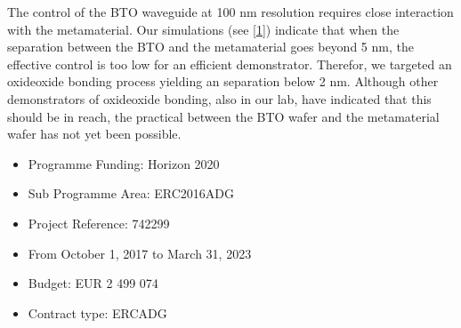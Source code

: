\documentclass[a4paper,10pt,english,openany,oneside]{jupyterBook}
\begin{document}
\begin{DUlineblock}{0em}
\item[] 
\end{DUlineblock}

\begin{DUlineblock}{0em}
\item[] 
\end{DUlineblock}

\begin{DUlineblock}{0em}
\item[] 
\end{DUlineblock}

\sphinxAtStartPar
The control of the BTO waveguide at 100 nm resolution requires close interaction with the metamaterial. Our simulations (see {[}\hyperlink{cite.bib:id4}{1}{]}) indicate that when the separation between the BTO and the metamaterial goes beyond 5 nm, the effective control is too low for an efficient demonstrator. Therefor, we targeted an oxide\sphinxhyphen{}oxide bonding process yielding an separation below 2 nm. Although other demonstrators of oxide\sphinxhyphen{}oxide bonding, also in our lab, have indicated that this should be in reach, the practical between the BTO wafer and the metamaterial wafer has not yet been possible.

\begin{DUlineblock}{0em}
\item[] 
\end{DUlineblock}
\begin{itemize}
\item {} 
\sphinxAtStartPar
Programme Funding: Horizon 2020

\item {} 
\sphinxAtStartPar
Sub Programme Area: ERC\sphinxhyphen{}2016\sphinxhyphen{}ADG

\item {} 
\sphinxAtStartPar
Project Reference: 742299

\item {} 
\sphinxAtStartPar
From October 1, 2017 to March 31, 2023

\item {} 
\sphinxAtStartPar
Budget: EUR 2 499 074

\item {} 
\sphinxAtStartPar
Contract type: ERC\sphinxhyphen{}ADG

\end{itemize}
\end{document}
